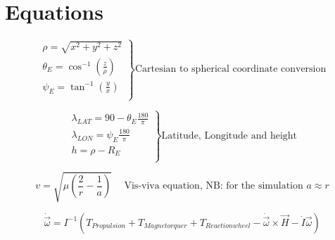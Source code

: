 \chapter{Equations}

\begin{equation}\label{cart2spheric}
	\left.
	\begin{array}{lll}
		\rho = \sqrt{x^2+y^2+z^2}\\
		\theta_E = \cos^{-1}\left(\frac{z}{\rho}\right)\\
		\psi_E = \tan^{-1}\left(\frac{y}{x}\right)\\
	\end{array}
	\right \} \text{Cartesian to spherical coordinate conversion}
\end{equation}

\begin{equation}\label{spheric2latlong}
	\left.
	\begin{array}{lll}
		\lambda_{LAT} = 90-\theta_E\frac{180}{\pi}\\
		\lambda_{LON} = \psi_E\frac{180}{\pi}\\
		h = \rho-R_E\\
	\end{array}
	\right \} \text{Latitude, Longitude and height}
\end{equation}

\begin{equation}\label{visviva}
	v = \sqrt{\mu\left(\frac{2}{r}-\frac{1}{a}\right)}\hspace{15pt}\text{Vis-viva equation, NB: for the simulation }a\approx r
\end{equation}

\begin{equation}\label{rotinertial}
	\dot{\vec{\omega}} = I^{-1}\left(T_{Propulsion} + T_{Magnetorquer} + T_{Reactionwheel} - \dot{\vec{\omega}}\times\vec{H} - \dot{I}\vec{\omega}\right)
\end{equation}

